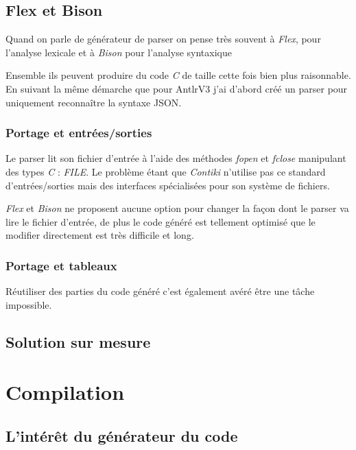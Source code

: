 \subsection{Flex et Bison}
Quand on parle de générateur de parser on pense très souvent à \emph{Flex}\cite{flex}, pour l'analyse lexicale et à \emph{Bison}\cite{bison} pour l'analyse syntaxique

Ensemble ils peuvent produire du code \emph{C} de taille cette fois bien plus raisonnable. En suivant la même démarche que pour AntlrV3 j'ai d'abord créé un parser pour uniquement reconnaître la syntaxe JSON.

\subsubsection{Portage et entrées/sorties}

Le parser lit son fichier d'entrée à l'aide des méthodes \emph{fopen} et \emph{fclose} manipulant des types \emph{C} : \emph{FILE}. Le problème étant que \emph{Contiki} n'utilise pas ce standard d'entrées/sorties mais des interfaces spécialisées pour son système de fichiers.

\emph{Flex} et \emph{Bison} ne proposent aucune option pour changer la façon dont le parser va lire le fichier d'entrée, de plus le code généré est tellement optimisé que le modifier directement est très difficile et long.

\subsubsection{Portage et tableaux}

Réutiliser des parties du code généré c'est également avéré être une tâche impossible.


\subsection{Solution sur mesure}


\section{Compilation}

\subsection{L'intérêt du générateur du code}


